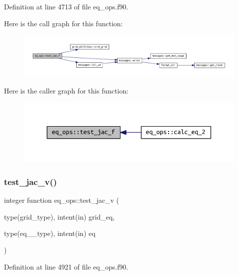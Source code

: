 Definition at line 4713 of file eq\+\_\+ops.\+f90.

Here is the call graph for this function\+:
\nopagebreak
\begin{figure}[H]
\begin{center}
\leavevmode
\includegraphics[width=350pt]{namespaceeq__ops_a05dcd4803b9c7845d3353614c9630c23_cgraph}
\end{center}
\end{figure}
Here is the caller graph for this function\+:
\nopagebreak
\begin{figure}[H]
\begin{center}
\leavevmode
\includegraphics[width=350pt]{namespaceeq__ops_a05dcd4803b9c7845d3353614c9630c23_icgraph}
\end{center}
\end{figure}
\mbox{\label{namespaceeq__ops_aef40d04e93f6a96576f8fe893fb086f8}} 
\subsubsection{\texorpdfstring{test\+\_\+jac\+\_\+v()}{test\_jac\_v()}}
{\footnotesize\ttfamily integer function eq\+\_\+ops\+::test\+\_\+jac\+\_\+v (\begin{DoxyParamCaption}\item[{type(grid\+\_\+type), intent(in)}]{grid\+\_\+eq,  }\item[{type(eq\+\_\+2\+\_\+type), intent(in)}]{eq }\end{DoxyParamCaption})}



Definition at line 4921 of file eq\+\_\+ops.\+f90.

